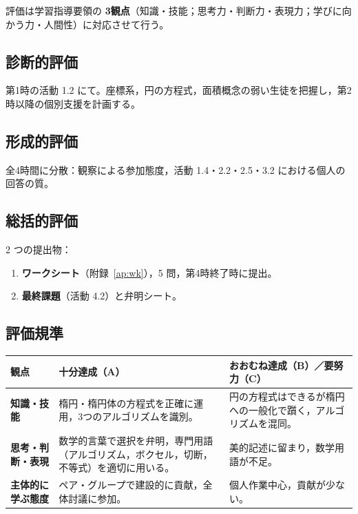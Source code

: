 \documentclass[12pt,a4paper]{scrartcl}
\newcommand{\acc}[1]{\textcolor{accent}{\textbf{#1}}}
\begin{document}
評価は学習指導要領の \acc{3観点}（知識・技能；思考力・判断力・表現力；学びに向かう力・人間性）に対応させて行う。

\subsection{診断的評価}
第1時の活動 1.2 にて。座標系，円の方程式，面積概念の弱い生徒を把握し，第2時以降の個別支援を計画する。

\subsection{形成的評価}
全4時間に分散：観察による参加態度，活動 1.4・2.2・2.5・3.2 における個人の回答の質。

\subsection{総括的評価}
2 つの提出物：
\begin{enumerate}[leftmargin=1.5em,itemsep=0.2em,topsep=0.3em,nosep]
  \item \textbf{ワークシート}（附録~\ref{ap:wk}），5 問，第4時終了時に提出。
  \item \textbf{最終課題}（活動 4.2）と弁明シート。
\end{enumerate}

\subsection{評価規準}

\begin{center}
\small
\begin{tabularx}{\textwidth}{@{}p{}XX@{}}
\toprule
\textbf{観点} & \textbf{十分達成（A）} & \textbf{おおむね達成（B）／要努力（C）} \\
\midrule
\textbf{知識・技能} & 楕円・楕円体の方程式を正確に運用，3つのアルゴリズムを識別。 & 円の方程式はできるが楕円への一般化で躓く，アルゴリズムを混同。 \\
\addlinespace[3pt]
\textbf{思考・判断・表現} & 数学的言葉で選択を弁明，専門用語（アルゴリズム，ボクセル，切断，不等式）を適切に用いる。 & 美的記述に留まり，数学用語が不足。 \\
\addlinespace[3pt]
\textbf{主体的に学ぶ態度} & ペア・グループで建設的に貢献，全体討議に参加。 & 個人作業中心，貢献が少ない。 \\
\bottomrule
\end{tabularx}
\end{center}
\end{document}
